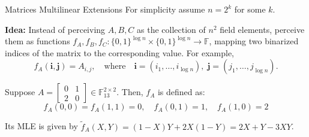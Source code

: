 \documentclass{zkdl-presentation-template}
\begin{document}
    \begin{frame}{Matrices Multilinear Extensions}
        For simplicity assume $n = 2^k$ for some $k$.\pause

        \textbf{Idea:} Instead of perceiving $A,B,C$ as the collection of $n^2$
        field elements, perceive them as functions $f_A,f_B,f_C: \{0,1\}^{\log
        n} \times \{0,1\}^{\log n} \to \mathbb{F}$, mapping two binarized
        indices of the matrix to the corresponding value. For example,
        \begin{equation*}
            f_A(\boldsymbol{i}, \boldsymbol{j}) = A_{i,j}, \quad \text{where} \quad \boldsymbol{i} = (i_1,\dots,i_{\log n}), \; \boldsymbol{j} = (j_1,\dots,j_{\log n}).
        \end{equation*}
        \vspace{-20px}
        \pause\begin{example}
            Suppose $A = \begin{bmatrix} 0 & 1 \\ 2 & 0 \end{bmatrix} \in
            \mathbb{F}_{13}^{2 \times 2}$. Then, $f_A$ is defined as:
            \begin{equation*}
                f_A(0,0) = f_A(1,1) = 0, \quad f_A(0,1) = 1, \quad f_A(1,0) = 2
            \end{equation*}

            \pause Its MLE is given by $\widetilde{f}_A(X, Y) = (1-X)Y + 2X(1-Y) = 2X+Y-3XY$.
        \end{example}
    \end{frame}
\end{document}
